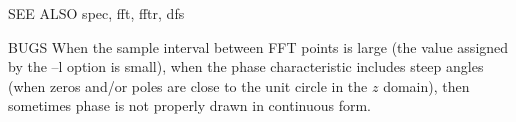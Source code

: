 \begin{qsection}{SEE ALSO}
  spec, fft, fftr, dfs
\end{qsection}

\begin{qsection}{BUGS}
When the sample interval between FFT points is large
(the value assigned by the --l option is small),
when the phase characteristic includes steep angles
(when zeros and/or poles are close to the unit circle in the $z$
 domain), then sometimes phase is not properly drawn in continuous form.
\end{qsection}
